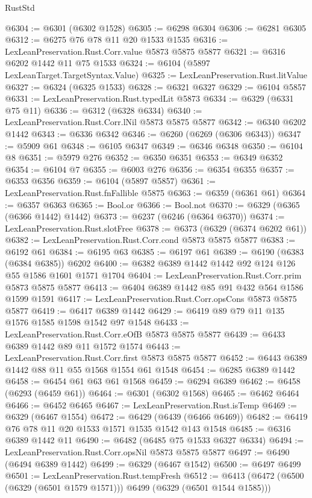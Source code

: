 \begin{lexlean}{RustStd}
\begin{coremodule}
{{@6304 := @6301 (@6302 @1528)
@6305 := @6298 @6304
@6306 := @6281 @6305
@6312 := @6275 @76 @78 @11 @20 @1533 @1535
@6316 := LexLeanPreservation.Rust.Corr.value @5873 @5875 @5877
@6321 := @6316 @6202 @1442 @11 @75 @1533
@6324 := @6104 (@5897 LexLeanTarget.TargetSyntax.Value)
@6325 := LexLeanPreservation.Rust.litValue
@6327 := @6324 (@6325 @1533)
@6328 := @6321 @6327
@6329 := @6104 @5857
@6331 := LexLeanPreservation.Rust.typedLit @5873
@6334 := @6329 (@6331 @75 @11)
@6336 := @6312 (@6328 @6334)
@6340 := LexLeanPreservation.Rust.Corr.lNil @5873 @5875 @5877
@6342 := @6340 @6202 @1442
@6343 := @6336 @6342
@6346 := @6260 (@6269 (@6306 @6343))
@6347 := @5909 @61
@6348 := @6105 @6347
@6349 := @6346 @6348
@6350 := @6104 @8
@6351 := @5979 @276
@6352 := @6350 @6351
@6353 := @6349 @6352
@6354 := @6104 @7
@6355 := @6003 @276
@6356 := @6354 @6355
@6357 := @6353 @6356
@6359 := @6104 (@5897 @5857)
@6361 := LexLeanPreservation.Rust.fnFallible @5875
@6363 := @6359 (@6361 @61)
@6364 := @6357 @6363
@6365 := Bool.or
@6366 := Bool.not
@6370 := @6329 (@6365 (@6366 @1442) @1442)
@6373 := @6237 (@6246 (@6364 @6370))
@6374 := LexLeanPreservation.Rust.slotFree
@6378 := @6373 (@6329 (@6374 @6202 @61))
@6382 := LexLeanPreservation.Rust.Corr.cond @5873 @5875 @5877
@6383 := @6192 @61
@6384 := @6195 @63
@6385 := @6197 @61
@6389 := @6190 (@6383 (@6384 @6385)) @6202
@6400 := @6382 @6389 @1442 @1442 @92 @124 @126 @55 @1586 @1601 @1571 @1704
@6404 := LexLeanPreservation.Rust.Corr.prim @5873 @5875 @5877
@6413 := @6404 @6389 @1442 @85 @91 @432 @564 @1586 @1599 @1591
@6417 := LexLeanPreservation.Rust.Corr.opsCons @5873 @5875 @5877
@6419 := @6417 @6389 @1442
@6429 := @6419 @89 @79 @11 @135 @1576 @1585 @1598 @1542 @97 @1548
@6433 := LexLeanPreservation.Rust.Corr.eOfB @5873 @5875 @5877
@6439 := @6433 @6389 @1442 @89 @11 @1572 @1574
@6443 := LexLeanPreservation.Rust.Corr.first @5873 @5875 @5877
@6452 := @6443 @6389 @1442 @88 @11 @55 @1568 @1554 @61 @1548
@6454 := @6285 @6389 @1442
@6458 := @6454 @61 @63 @61 @1568
@6459 := @6294 @6389
@6462 := @6458 (@6293 (@6459 @61))
@6464 := @6301 (@6302 @1568)
@6465 := @6462 @6464
@6466 := @6452 @6465
@6467 := LexLeanPreservation.Rust.isTemp
@6469 := @6329 (@6467 @1554)
@6472 := @6429 (@6439 (@6466 @6469))
@6482 := @6419 @76 @78 @11 @20 @1533 @1571 @1535 @1542 @143 @1548
@6485 := @6316 @6389 @1442 @11
@6490 := @6482 (@6485 @75 @1533 @6327 @6334)
@6494 := LexLeanPreservation.Rust.Corr.opsNil @5873 @5875 @5877
@6497 := @6490 (@6494 @6389 @1442)
@6499 := @6329 (@6467 @1542)
@6500 := @6497 @6499
@6501 := LexLeanPreservation.Rust.tempFresh
@6512 := @6413 (@6472 (@6500 (@6329 (@6501 @1579 @1571))) @6499 (@6329 (@6501 @1544 @1585)))
}}
\end{coremodule}
\end{lexlean}
